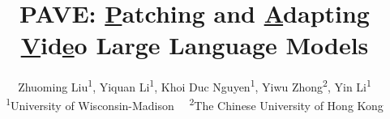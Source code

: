 \documentclass[10pt,twocolumn,letterpaper]{article}
\title{PAVE: \underline{P}atching and \underline{A}dapting \underline{V}id\underline{e}o Large Language Models}
\author{Zhuoming Liu\textsuperscript{1}, Yiquan Li\textsuperscript{1}, Khoi Duc Nguyen\textsuperscript{1}, Yiwu Zhong\textsuperscript{2}, Yin Li\textsuperscript{1}\\
{\textsuperscript{1}University of Wisconsin-Madison \ \ 
\textsuperscript{2}The Chinese University of Hong Kong}
}
\begin{document}
\maketitle
    





{
    \small
    
    
}

\clearpage

\end{document}

